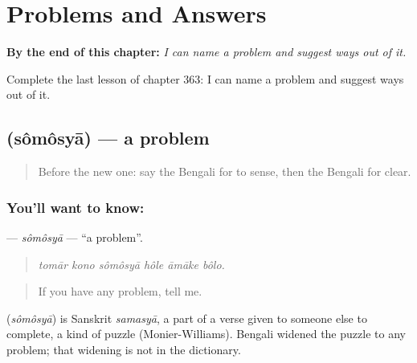 
\chapter{Problems and Answers}
\label{ch:bn-problems-and-answers}

\begin{chapteropening}
\textbf{By the end of this chapter:} \emph{I can name a problem and suggest ways out of it.}

Complete the last lesson of chapter 363: I can name a problem and suggest ways out of it.
\end{chapteropening}

\section[\texorpdfstring{\bn{সমস্যা} (sômôsyā)}{সমস্যা (sômôsyā)}]{ (sômôsyā) — a problem}

\label{lesson:BN-C363-somosya}



\begin{quote}
Before the new one: say the Bengali for to sense, then the Bengali for clear.
\end{quote}

\subsection*{You'll want to know: }
\textbf{} — \emph{sômôsyā} — \textquotedblleft{}a problem\textquotedblright{}.

\begin{quote}
     
\end{quote}

\begin{quote}
\emph{tomār kono sômôsyā hôle āmāke bôlo.}
\end{quote}

\begin{quote}
If you have any problem, tell me.
\end{quote}

\begin{cousinweb}
\textbf{} (\emph{sômôsyā}) is Sanskrit \emph{samasyā}, a part of a verse given to someone else to complete, a kind of puzzle (Monier-Williams). Bengali widened the puzzle to any problem; that widening is not in the dictionary.
\end{cousinweb}

